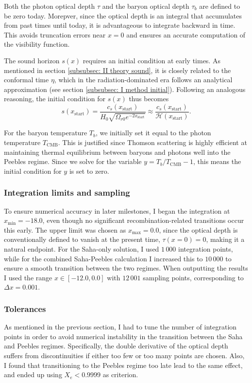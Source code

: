 \documentclass{aa}
\numberwithin{equation}{section}
\numberwithin{table}{section}
\numberwithin{figure}{section}
\begin{document}
Both the photon optical depth $\tau$ and the baryon optical depth $\tau_b$ are defined to be zero today. Morepver, since the optical depth is an integral that accumulates from past times until today, it is advantageous to integrate backward in time. This avoids truncation errors near $x = 0$ and ensures an accurate computation of the visibility function.

The sound horizon $s(x)$ requires an initial condition at early times. As mentioned in section \ref{subsubsec: II theory sound}, it is closely related to the conformal time $\eta$, which in the radiation-dominated era follows an analytical approximation (see section \ref{subsubsec: I method initial}). Following an analogous reasoning, the initial condition for $s(x)$ thus becomes
\begin{equation}
  s(x_\text{start}) = \frac{c_s(x_\text{start})}{H_0\sqrt{\Omega_{r0}e^{-2x_\text{start}}}} \approx \frac{c_s(x_\text{start})}{\mathcal{H}(x_{\text{start}})}.
\end{equation}

For the baryon temperature $T_b$, we initially set it equal to the photon temperature $T_\text{CMB}$. This is justified since Thomson scattering is highly efficient at maintaining thermal equilibrium between baryons and photons well into the Peebles regime. Since we solve for the variable $y = T_b / T_\text{CMB} - 1$, this means the initial condition for $y$ is set to zero.



\subsubsection{Integration limits and sampling}
To ensure numerical accuracy in later milestones, I began the integration at $x_\text{min} = -18.0$, even though no significant recombination-related transitions occur this early. The upper limit was chosen as $x_\text{max} = 0.0$, since the optical depth is conventionally defined to vanish at the present time, $\tau(x = 0) = 0$, making it a natural endpoint. For the Saha-only solution, I used $1\,000$ integration points, while for the combined Saha-Peebles calculation I increased this to $10\,000$ to ensure a smooth transition between the two regimes. When outputting the results I used the range $x \in [-12.0, 0.0]$ with $12\,001$ sampling points, corresponding to $\Delta x = 0.001$.


\subsubsection{Tolerances}
As mentioned in the previous section, I had to tune the number of integration points in order to avoid numerical instability in the transition between the Saha and Peebles regimes. Specifically, the double derivative of the optical depth suffers from discontinuities if either too few or too many points are chosen. Also, I found that transitioning to the Peebles regime too late lead to the same effect, and ended up using $X_e<0.9999$ as criterion. 
\end{document}
